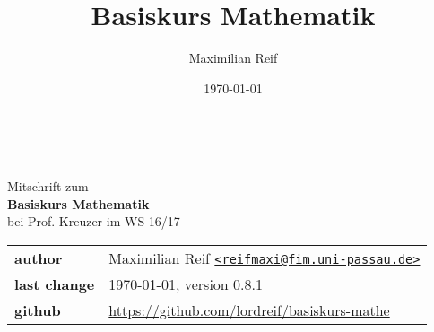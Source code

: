 \documentclass[11pt,a4paper,ngerman]{article}
\date{\today}
\author{Maximilian Reif}
\title{Basiskurs Mathematik}
\begin{document}
\begin{titlepage}
    \ \newline\newline\newline\newline\newline
	
	\begin{center}

		\huge Mitschrift zum\\
		\Huge\textbf{Basiskurs Mathematik}\\
		\huge bei Prof. Kreuzer im WS 16/17\\
		\normalsize

		\vspace{1cm}
		\begin{tabular}[b]{l|l}
			\textbf{author} 		& Maximilian Reif
			\texttt{\href{mailto:reifmaxi@fim.uni-passau.de}
			{<reifmaxi@fim.uni-passau.de>}}\\
			\textbf{last change} 	& \today, version 0.8.1\\
			\textbf{github} 		& \url{https://github.com/lordreif/basiskurs-mathe}
		\end{tabular}
		\vspace{1cm}
		
	\end{center}
   
	
\end{titlepage}

\setcounter{page}{2}

\newpage
\tableofcontents\thispagestyle{empty}
\newpage








%
%
%
\setcounter{section}{10}


\end{document}
